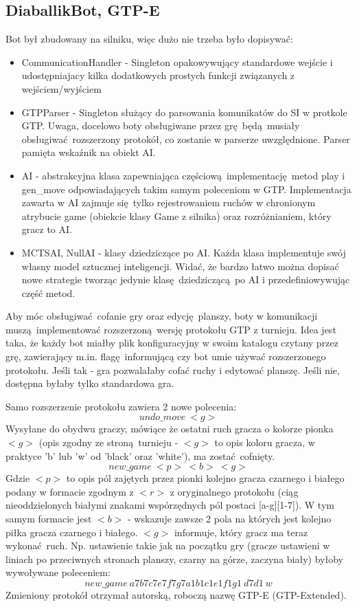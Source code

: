 \documentclass[a4paper,12pt]{article}
\begin{document}
\subsection{DiaballikBot, GTP-E}
Bot był zbudowany na silniku, więc dużo nie trzeba było dopisywać:
\begin{itemize}
 \item CommunicationHandler - Singleton opakowywujący standardowe wejście i udostępniajacy kilka dodatkowych prostych funkcji związanych z 
 wejściem/wyjściem
 \item GTPParser - Singleton służący do parsowania komunikatów do SI w protkole GTP. Uwaga, docelowo boty obsługiwane przez grę będą musiały
 obsługiwać rozszerzony protokół, co zostanie w parserze uwzględnione. Parser pamięta wskaźnik na obiekt AI.
 \item AI - abstrakcyjna klasa zapewniająca częściową implementację metod play i gen\_move odpowiadających takim samym poleceniom w GTP. Implementacja
 zawarta w AI zajmuje się tylko rejestrowaniem ruchów w chronionym atrybucie game (obiekcie klasy Game z silnika) oraz rozróżnianiem, który gracz to AI.
 \item MCTSAI, NullAI - klasy dziedziczące po AI. Każda klasa implementuje swój własny model sztucznej inteligencji. Widać, że bardzo łatwo można
 dopisać nowe strategie tworząc jedynie klasę dziedziczącą po AI i przedefiniowywując część metod.
\end{itemize}
Aby móc obsługiwać cofanie gry oraz edycję planszy, boty w komunikacji muszą implementować rozszerzoną wersję protokołu GTP z turnieju. Idea jest
taka, że każdy bot miałby plik konfiguracyjny w swoim katalogu czytany przez grę, zawierający m.in. flagę informującą czy bot umie używać rozszerzonego
protokołu. Jeśli tak - gra pozwalałaby cofać ruchy i edytować planszę. Jeśli nie, dostępna byłaby tylko standardowa gra.

Samo rozszerzenie protokołu zawiera 2 nowe polecenia:
\[undo\_move ~ <g>\]
Wysyłane do obydwu graczy, mówiące że ostatni ruch gracza o kolorze pionka $<g>$ (opis zgodny ze stroną turnieju - $<g>$ to opis koloru gracza, w 
praktyce 'b' lub 'w' od 'black' oraz 'white'), ma zostać cofnięty.
\[new\_game ~ <p> ~ <b>  ~ <g>\]
Gdzie $<p>$ to opis pól zajętych przez pionki kolejno gracza czarnego i białego podany w formacie zgodnym z $<r>$ z oryginalnego protokołu (ciąg
nieoddzielonych białymi znakami wspórzędnych pól postaci [a-g][1-7]). W tym samym formacie jest $<b>$ - wskazuje zawsze 2 pola na których jest kolejno
piłka gracza czarnego i białego. $<g>$ informuje, który gracz ma teraz wykonać ruch. Np. ustawienie takie jak na początku gry (gracze ustawieni w
liniach po przeciwnych stronach planszy, czarny na górze, zaczyna biały) byłoby wywoływane poleceniem:
\[new\_game ~ a7b7c7e7f7g7a1b1c1e1f1g1 ~ d7d1 ~ w\]
Zmieniony protokół otrzymał autorską, roboczą nazwę GTP-E (GTP-Extended).
\end{document}
